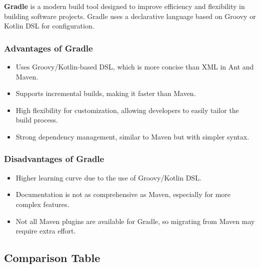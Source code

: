 \documentclass[aspectratio=169, table]{beamer}
\begin{document}
\begin{frame}[fragile]
	\textbf{Gradle} is a modern build tool designed to improve efficiency and flexibility in building software projects. Gradle uses a declarative language based on Groovy or Kotlin DSL for configuration.
	\frametitle{Advantages of Gradle}
	\begin{itemize}
		\item Uses Groovy/Kotlin-based DSL, which is more concise than XML in Ant and Maven.
		\item Supports incremental builds, making it faster than Maven.
		\item High flexibility for customization, allowing developers to easily tailor the build process.
		\item Strong dependency management, similar to Maven but with simpler syntax.
	\end{itemize}
\end{frame}

\begin{frame}[fragile]
	\frametitle{Disadvantages of Gradle}
	\begin{itemize}
		\item Higher learning curve due to the use of Groovy/Kotlin DSL.
		\item Documentation is not as comprehensive as Maven, especially for more complex features.
		\item Not all Maven plugins are available for Gradle, so migrating from Maven may require extra effort.
	\end{itemize}
\end{frame}

\subsection{Comparison Table}
\end{document}
